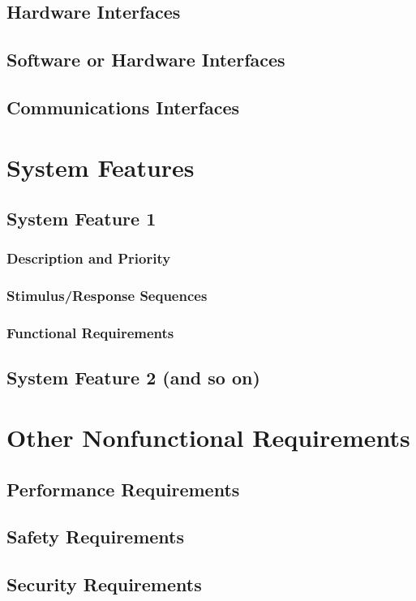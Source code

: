 \documentclass[english]{article}
\numberwithin{equation}{section} %
\begin{document}
\subsection{Hardware Interfaces}
\subsection{Software or Hardware Interfaces}
\subsection{Communications Interfaces}

\newpage
\section{System Features}
\subsection{System Feature 1}
\subsubsection{Description and Priority}
\subsubsection{Stimulus/Response Sequences}
\subsubsection{Functional Requirements}
\subsection{System Feature 2 (and so on)}

\newpage
\section{Other Nonfunctional Requirements}
\subsection{Performance Requirements}
\subsection{Safety Requirements}
\subsection{Security Requirements}
\end{document}
